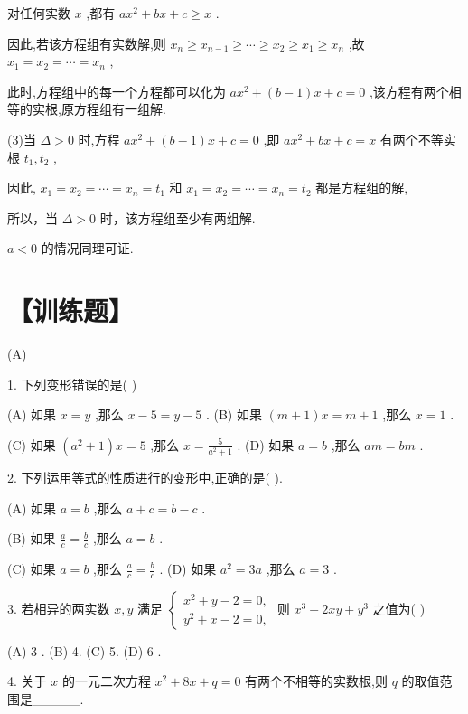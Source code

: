 \documentclass[10pt]{article}
\begin{document}
对任何实数 \(x\) ,都有 \(a{x}^{2} + {bx} + c \geq  x\) .

因此,若该方程组有实数解,则 \({x}_{n} \geq  {x}_{n - 1} \geq  \cdots  \geq  {x}_{2} \geq  {x}_{1} \geq  {x}_{n}\) ,故 \({x}_{1} = {x}_{2} = \cdots  = {x}_{n}\) ,

此时,方程组中的每一个方程都可以化为 \(a{x}^{2} + \left( {b - 1}\right) x + c = 0\) ,该方程有两个相等的实根,原方程组有一组解.

(3)当 \(\Delta  > 0\) 时,方程 \(a{x}^{2} + \left( {b - 1}\right) x + c = 0\) ,即 \(a{x}^{2} + {bx} + c = x\) 有两个不等实根 \({t}_{1},{t}_{2}\) ,

因此, \({x}_{1} = {x}_{2} = \cdots  = {x}_{n} = {t}_{1}\) 和 \({x}_{1} = {x}_{2} = \cdots  = {x}_{n} = {t}_{2}\) 都是方程组的解,

所以，当 \(\Delta  > 0\) 时，该方程组至少有两组解.

\(a < 0\) 的情况同理可证.

\section*{【训练题】}

(A)

1. 下列变形错误的是( )

(A) 如果 \(x = y\) ,那么 \(x - 5 = y - 5\) . (B) 如果 \(\left( {m + 1}\right) x = m + 1\) ,那么 \(x = 1\) .

(C) 如果 \(\left( {{a}^{2} + 1}\right) x = 5\) ,那么 \(x = \frac{5}{{a}^{2} + 1}\) . (D) 如果 \(a = b\) ,那么 \({am} = {bm}\) .

2. 下列运用等式的性质进行的变形中,正确的是( ).

(A) 如果 \(a = b\) ,那么 \(a + c = b - c\) .

(B) 如果 \(\frac{a}{c} = \frac{b}{c}\) ,那么 \(a = b\) .

(C) 如果 \(a = b\) ,那么 \(\frac{a}{c} = \frac{b}{c}\) . (D) 如果 \({a}^{2} = {3a}\) ,那么 \(a = 3\) .

3. 若相异的两实数 \(x,y\) 满足 \(\left\{  \begin{array}{l} {x}^{2} + y - 2 = 0, \\  {y}^{2} + x - 2 = 0, \end{array}\right.\) 则 \({x}^{3} - {2xy} + {y}^{3}\) 之值为( )

(A) 3 . (B) 4. (C) 5. (D) 6 .

4. 关于 \(x\) 的一元二次方程 \({x}^{2} + {8x} + q = 0\) 有两个不相等的实数根,则 \(q\) 的取值范围是\_\_\_\_\_.
\end{document}
